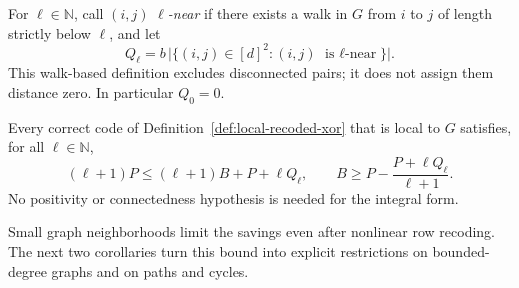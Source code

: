 For $\ell\in\mathbb N$, call $(i,j)$ \emph{$\ell$-near} if there exists a
walk in $G$ from $i$ to $j$ of length strictly below $\ell$, and let
\[
  Q_\ell=b\,\bigl|\{(i,j)\in[d]^2:(i,j)\text{ is $\ell$-near}\}\bigr|.
\]
This walk-based definition excludes disconnected pairs; it does not assign
them distance zero.  In particular $Q_0=0$.

\begin{theorem}\label{thm:local-xor-distance}
Every correct code of Definition~\ref{def:local-recoded-xor} that is local to
$G$ satisfies, for all $\ell\in\mathbb N$,
\begin{equation}\label{eq:local-xor-distance}
  (\ell+1)P\le(\ell+1)B+P+\ell Q_\ell,
  \qquad
  B\ge P-\frac{P+\ell Q_\ell}{\ell+1}.
\end{equation}
No positivity or connectedness hypothesis is needed for the integral form.
\end{theorem}

Small graph neighborhoods limit the savings even after nonlinear row
recoding.  The next two corollaries turn this bound into explicit restrictions
on bounded-degree graphs and on paths and cycles.

